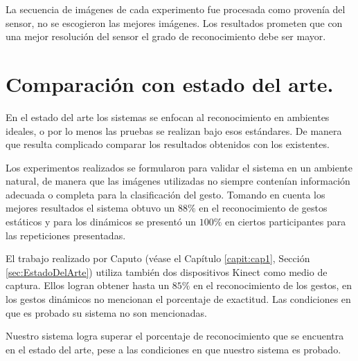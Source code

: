 La secuencia de imágenes de cada experimento fue procesada como provenía del sensor, no se escogieron las mejores imágenes. Los resultados prometen que con una mejor resolución del sensor el grado de reconocimiento debe ser mayor. 

\section{Comparación con estado del arte.}  

En el estado del arte los sistemas se enfocan al reconocimiento en ambientes ideales, o por lo menos las pruebas se realizan bajo esos estándares. De manera que resulta complicado comparar los resultados obtenidos con los existentes. 

Los experimentos realizados se formularon para validar el sistema en un ambiente natural, de manera que las imágenes utilizadas no siempre contenían información adecuada o completa para la clasificación del gesto. Tomando en cuenta los mejores resultados el sistema obtuvo un $88 \%$ en el reconocimiento de gestos estáticos y para los dinámicos se present\'o un $100 \%$ en ciertos participantes para las repeticiones presentadas. 

El trabajo realizado por Caputo (véase el Cap\'itulo \ref{capit:cap1}, Sección \ref{sec:EstadoDelArte}) utiliza también dos dispositivos Kinect como medio de captura. Ellos logran obtener hasta un $85 \%$ en el reconocimiento de los gestos, en los gestos dinámicos no mencionan el porcentaje de exactitud. Las condiciones en que es probado su sistema no son mencionadas. 

Nuestro sistema logra superar el porcentaje de reconocimiento que se encuentra en el estado del arte, pese a las condiciones en que nuestro sistema es probado.  


\newpage